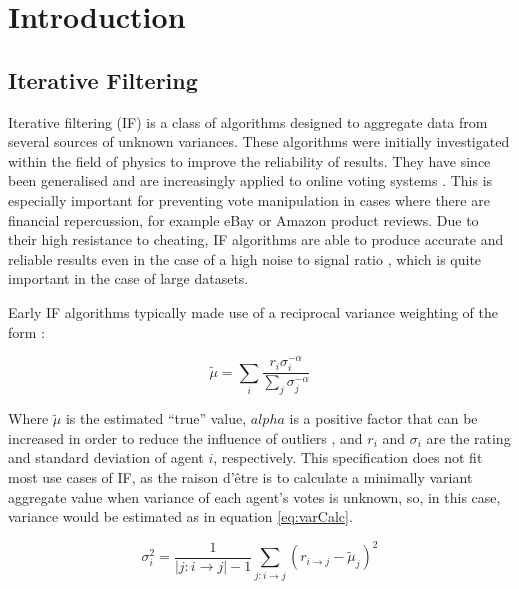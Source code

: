 
\chapter{Introduction} %

\section{Iterative Filtering}\label{sec:IFBack}
Iterative filtering (IF) is a class of algorithms designed to aggregate data from several sources of unknown variances. These algorithms were initially investigated within the field of physics to improve the reliability of results. They have since been generalised and are increasingly applied to online voting systems \cite{laureti2006information}. This is especially important for preventing vote manipulation in cases where there are financial repercussion, for example eBay or Amazon product reviews. Due to their high resistance to cheating, IF algorithms are able to produce accurate and reliable results even in the case of a high noise to signal ratio \cite{juselius2014testing}, which is quite important in the case of large datasets.

Early IF algorithms typically made use of a reciprocal variance weighting of the form \cite{laureti2006information, de2007iterative, de2010iterative}:

\begin{equation}
    \tilde{\mu} = \sum\limits_i\frac{r_i\sigma_i^{-\alpha}}{\sum\limits_j \sigma_j^{-\alpha}} \label{eq:negRecip}
\end{equation}

Where $\tilde{\mu}$ is the estimated ``true'' value, $alpha$ is a positive factor that can be increased in order to reduce the influence of outliers \cite{ifNotes4121}, and $r_i$ and $\sigma_i$ are the rating and standard deviation of agent $i$, respectively. This specification does not fit most use cases of IF, as the raison d'\^etre is to calculate a minimally variant aggregate value when variance of each agent's votes is unknown, so, in this case, variance would be estimated as in equation \ref{eq:varCalc}.

\begin{equation}
\sigma_i^2 = \frac{1}{|j:i\rightarrow j| - 1}\sum\limits_{j:i\rightarrow j}(r_{i\rightarrow j} - \tilde{\mu}_j)^2 \label{eq:varCalc}
\end{equation}

